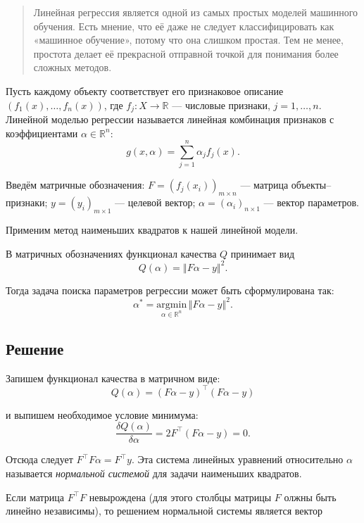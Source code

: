 \documentclass[11pt,a4paper]{article}
\begin{document}
\begin{quote}
Линейная регрессия является одной из самых простых моделей машинного
обучения. Есть мнение, что её даже не следует классифицировать как
«машинное обучение», потому что она слишком простая. Тем не менее,
простота делает её прекрасной отправной точкой для понимания более
сложных методов.
\end{quote}

Пусть каждому объекту соответствует его признаковое описание
\(\left( f_1(x), \ldots, f_n(x)\right)\), где
\(f_j: X \rightarrow \mathbb{R}\) --- числовые признаки,
\(j = 1, \ldots , n\). Линейной моделью регрессии называется линейная
комбинация признаков с коэффициентами \(\alpha \in \mathbb{R}^n\):
\[ g(x, \alpha) = \sum_{j=1}^n \alpha_j f_j(x). \]

Введём матричные обозначения:
\(F = \left( f_j(x_i) \right)_{m \times n}\) --- матрица
объекты--признаки; \(y = \left( y_i \right)_{m \times 1}\) --- целевой
вектор; \(\alpha = \left( \alpha_i \right)_{n \times 1}\) --- вектор
параметров.

Применим метод наименьших квадратов к нашей линейной модели.

В матричных обозначениях функционал качества \(Q\) принимает вид
\[ Q(\alpha) = \left\Vert F\alpha - y \right\Vert^2. \]

Тогда задача поиска параметров регрессии может быть сформулирована так:
\[ \alpha^* = \underset{\alpha \in \mathbb{R}^n}{\text{argmin}} \, {\left\Vert F\alpha - y \right\Vert^2}. \]

    \hypertarget{ux440ux435ux448ux435ux43dux438ux435}{%
\subsection{Решение}\label{ux440ux435ux448ux435ux43dux438ux435}}

Запишем функционал качества в матричном виде:
\[ Q(\alpha) = (F\alpha - y)^\top (F\alpha - y) \]

и выпишем необходимое условие минимума:
\[ \frac{\delta Q(\alpha)}{\delta \alpha} = 2F^\top (F\alpha - y) = 0. \]

Отсюда следует \(F^{\top} F \alpha = F^{\top}y\). Эта система линейных
уравнений относительно \(\alpha\) называется \emph{нормальной системой}
для задачи наименьших квадратов.

Если матрица \(F^{\top} F\) невырождена (для этого столбцы матрицы \(F\)
олжны быть линейно независимы), то решением нормальной системы является
вектор
\end{document}
